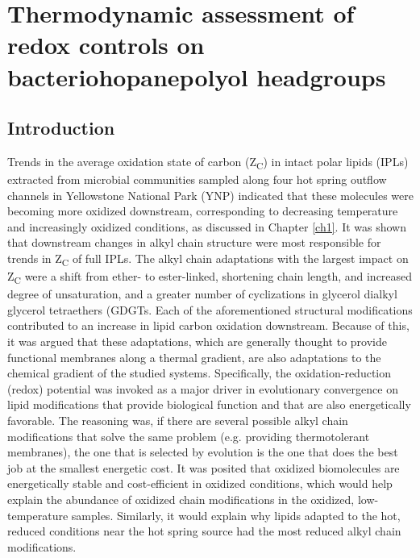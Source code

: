 \chapter{Thermodynamic assessment of redox controls on bacteriohopanepolyol headgroups}\label{ch3}




\section{Introduction}

Trends in the average oxidation state of carbon (Z\textsubscript{C}) in intact polar lipids (IPLs) extracted from microbial communities sampled along four hot spring outflow channels in Yellowstone National Park (YNP) indicated that these molecules were becoming more oxidized downstream, corresponding to decreasing temperature and increasingly oxidized conditions, as discussed in Chapter \ref{ch1}. It was shown that downstream changes in alkyl chain structure were most responsible for trends in Z\textsubscript{C} of full IPLs. The alkyl chain adaptations with the largest impact on Z\textsubscript{C} were a shift from ether- to ester-linked, shortening chain length, and increased degree of unsaturation, and a greater number of cyclizations in glycerol dialkyl glycerol tetraethers (GDGTs. Each of the aforementioned structural modifications contributed to an increase in lipid carbon oxidation downstream. Because of this, it was argued that these adaptations, which are generally thought to provide functional membranes along a thermal gradient, are also adaptations to the chemical gradient of the studied systems. Specifically, the oxidation-reduction (redox) potential was invoked as a major driver in evolutionary convergence on lipid modifications that provide biological function and that are also energetically favorable. The reasoning was, if there are several possible alkyl chain modifications that solve the same problem (e.g. providing thermotolerant membranes), the one that is selected by evolution is the one that does the best job at the smallest energetic cost. It was posited that oxidized biomolecules are energetically stable and cost-efficient in oxidized conditions, which would help explain the abundance of oxidized chain modifications in the oxidized, low-temperature samples. Similarly, it would explain why lipids adapted to the hot, reduced conditions near the hot spring source had the most reduced alkyl chain modifications.

